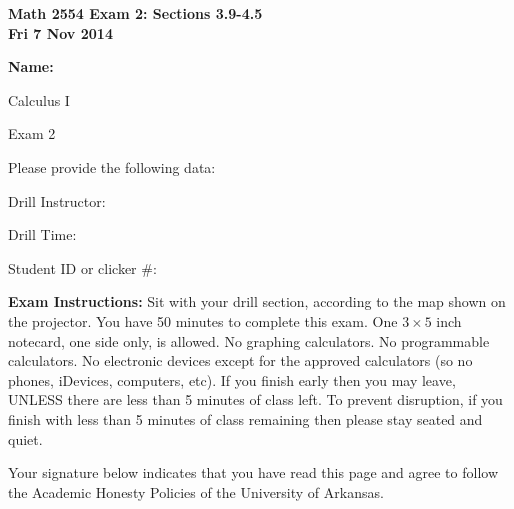 \documentclass[11pt,letterpaper]{article}
\begin{document}
\flushleft
\begin{multicols}{2}

\begin{large}\textbf{Math 2554 Exam 2: Sections 3.9-4.5 \\
Fri 7 Nov 2014}\end{large}

\hfill\textbf{Name:  }\underline{\hspace{40ex}} %
\\
\vspace{.5in}

\end{multicols}

\pagestyle{empty}

\flushleft

\begin{center}\Large Calculus I 

Exam 2 \end{center}

\vspace{2pc}
Please provide the following data:

\vspace{2pc}
Drill Instructor: \underline{\hspace{40ex}}

\vspace{2pc}
Drill Time: \underline{\hspace{40ex}}

\vspace{2pc}
Student ID or clicker \#: \underline{\hspace{40ex}}

\vspace{3pc}
{\bf Exam Instructions:} Sit with your drill section, according to the map shown on the projector.  You have 50 minutes to complete this exam.  One $3\times 5$ inch notecard, one side only, is allowed.  No graphing calculators.  No programmable calculators.  No electronic devices except for the approved calculators (so no phones, iDevices, computers, etc).  If you finish early then you may leave, UNLESS there are less than 5 minutes of class left.  To prevent disruption, if you finish with less than 5 minutes of class remaining then please stay seated and quiet.

\vspace{5pc}
Your signature below indicates that you have read this page and agree to follow the Academic Honesty Policies of the University of Arkansas.  
\end{document}
